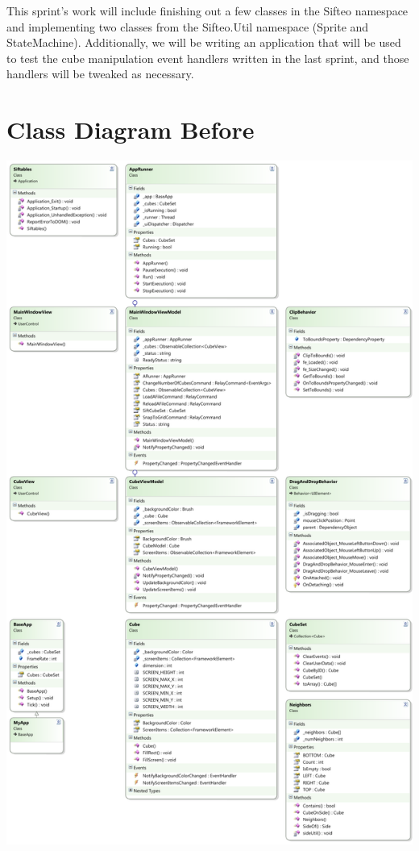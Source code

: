 \documentclass[12pt]{article}
\begin{document}
This sprint's work will include finishing out a few classes in the Sifteo namespace and implementing two classes from the Sifteo.Util namespace (Sprite and StateMachine). Additionally, we will be writing an application that will be used to test the cube manipulation event handlers written in the last sprint, and those handlers will be tweaked as necessary.

\section*{Class Diagram Before}
\includegraphics[scale=.6]{pdfs/374docs/MS5Models/ClassDiagram_cropped.pdf}
\end{document}
